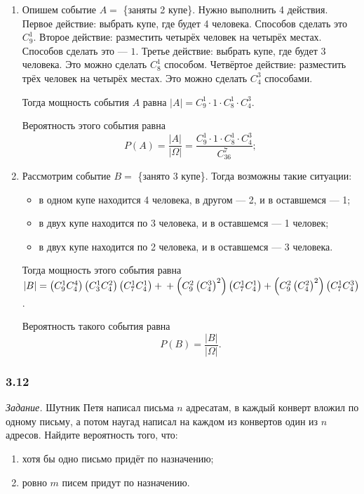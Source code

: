 \begin{enumerate}[label=\alph*)]
\item Опишем событие $A = $ \{заняты 2 купе\}.
Нужно выполнить 4 действия.
Первое действие: выбрать купе, где будет 4 человека.
Способов сделать это $C_9^1$.
Второе действие: разместить четырёх человек на четырёх местах.
Способов сделать это --- $1$.
Третье действие: выбрать купе, где будет 3 человека.
Это можно сделать $C_8^1$ способом.
Четвёртое действие: разместить трёх человек на четырёх местах.
Это можно сделать $C_4^3$ способами.

Тогда мощность события $A$ равна $ \left| A \right| = C_9^1 \cdot 1 \cdot C_8^1 \cdot C_4^3$.

Вероятность этого события равна
$$P \left( A \right) =
\frac{ \left| A \right| }{ \left| \Omega \right| } =
\frac{C_9^1 \cdot 1 \cdot C_8^1 \cdot C_4^3}{C_{36}^7};$$

\item Рассмотрим событие $B =$ \{занято 3 купе\}.
Тогда возможны такие ситуации:
\begin{itemize}
\item в одном купе находится 4 человека, в другом --- 2, и в оставшемся --- 1;
\item в двух купе находится по 3 человека, и в оставшемся --- 1 человек;
\item в двух купе находится по 2 человека, и в оставшемся --- 3 человека.
\end{itemize}

Тогда мощность этого события равна
$ \left| B \right| =
\left( C_9^1 C_4^4 \right) \left(C_3^1 C_4^2 \right) \left( C_7^1 C_4^1 \right) + \\
+ \left( C_9^2 \left( C_4^3 \right)^2 \right) \left( C_7^1 C_4^1 \right) +
\left( C_9^2 \left( C_4^2 \right)^2 \right) \left( C_7^1 C_4^3 \right)$.

Вероятность такого события равна
$$P \left( B \right) =
\frac{ \left| B \right| }{ \left| \Omega \right| }.$$
\end{enumerate}

\subsubsection*{3.12}

\textit{Задание.} Шутник Петя написал письма $n$ адресатам, в каждый конверт вложил по одному письму, а потом наугад написал на каждом из конвертов один из $n$ адресов.
Найдите вероятность того, что:
\begin{enumerate}[label=\alph*)]
\item хотя бы одно письмо придёт по назначению;
\item ровно $m$ писем придут по назначению.
\end{enumerate}

